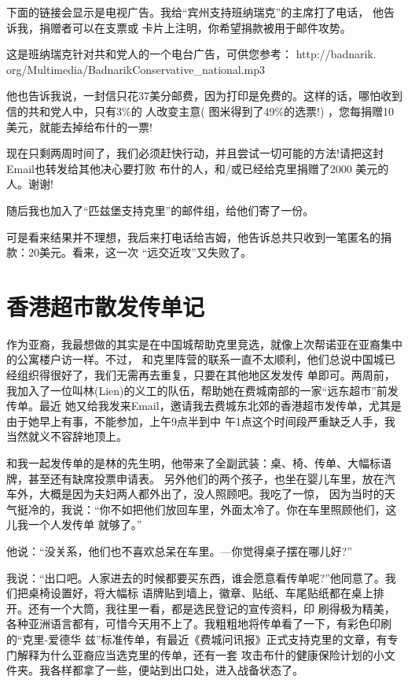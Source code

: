 ﻿\documentclass[11pt]{article}
\begin{document}
下面的链接会显示是电视广告。我给``宾州支持班纳瑞克''的主席打了电话， 他告诉我，捐赠者可以在支票或
卡片上注明，你希望捐款被用于邮件攻势。

这是班纳瑞克针对共和党人的一个电台广告，可供您参考： http://badnarik.
org/Multimedia/BadnarikConservative\_national.mp3

他也告诉我说，一封信只花37美分邮费，因为打印是免费的。这样的话，哪怕收到信的共和党人中，只有3\%的
人改变主意( 图米得到了49\%的选票!) ，您每捐赠10美元，就能去掉给布什的一票!

现在只剩两周时间了，我们必须赶快行动，并且尝试一切可能的方法!请把这封Email也转发给其他决心要打败
布什的人，和/或已经给克里捐赠了2000 美元的人。谢谢!

随后我也加入了``匹兹堡支持克里''的邮件组，给他们寄了一份。

可是看来结果并不理想，我后来打电话给吉姆，他告诉总共只收到一笔匿名的捐款：20美元。看来，这一次
``远交近攻''又失败了。

\section{香港超市散发传单记}

作为亚裔，我最想做的其实是在中国城帮助克里竞选，就像上次帮诺亚在亚裔集中的公寓楼户访一样。不过，
和克里阵营的联系一直不太顺利，他们总说中国城已经组织得很好了，我们无需再去重复，只要在其他地区发发传
单即可。两周前，我加入了一位叫林(Lien)的义工的队伍，帮助她在费城南部的一家``远东超市''前发传单。最近
她又给我发来Email，邀请我去费城东北郊的香港超市发传单，尤其是由于她早上有事，不能参加，上午9点半到中
午1点这个时间段严重缺乏人手，我当然就义不容辞地顶上。

和我一起发传单的是林的先生明，他带来了全副武装：桌、椅、传单、大幅标语牌，甚至还有缺席投票申请表。
另外他们的两个孩子，也坐在婴儿车里，放在汽车外，大概是因为夫妇两人都外出了，没人照顾吧。我吃了一惊，
因为当时的天气挺冷的，我说：``你不如把他们放回车里，外面太冷了。你在车里照顾他们，这儿我一个人发传单
就够了。''

他说：``没关系，他们也不喜欢总呆在车里。---你觉得桌子摆在哪儿好?''

我说：``出口吧。人家进去的时候都要买东西，谁会愿意看传单呢?''他同意了。我们把桌椅设置好，将大幅标
语牌贴到墙上，徽章、贴纸、车尾贴纸都在桌上排开。还有一个大筒，我往里一看，都是选民登记的宣传资料，印
刷得极为精美，各种亚洲语言都有，可惜今天用不上了。我粗粗地将传单看了一下，有彩色印刷的``克里-爱德华
兹''标准传单，有最近《费城问讯报》正式支持克里的文章，有专门解释为什么亚裔应当选克里的传单，还有一套
攻击布什的健康保险计划的小文件夹。我各样都拿了一些，便站到出口处，进入战备状态了。
\end{document}
